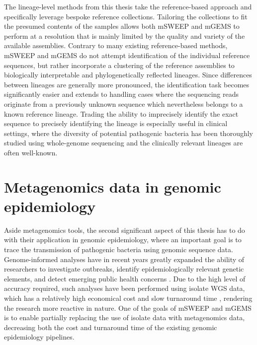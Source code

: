 \documentclass[officiallayout]{tktla}
\begin{document}
The lineage-level methods from this thesis take the reference-based
approach and specifically leverage bespoke reference
collections. Tailoring the collections to fit the presumed contents of
the samples allows both mSWEEP and mGEMS to perform at a resolution
that is mainly limited by the quality and variety of the available
assemblies. Contrary to many existing reference-based methods, mSWEEP
and mGEMS do not attempt identification of the individual reference
sequences, but rather incorporate a clustering of the reference
assemblies to biologically interpretable and phylogenetically
reflected lineages. Since differences between lineages are generally
more pronounced, the identification task becomes significantly easier
\citep{sankar2016bayesian} and extends to handling cases where the
sequencing reads originate from a previously unknown sequence which
nevertheless belongs to a known reference lineage. Trading the ability
to imprecisely identify the exact sequence to precisely identifying
the lineage is especially useful in clinical settings, where the
diversity of potential pathogenic bacteria has been thoroughly studied
using whole-genome sequencing and the clinically relevant lineages are
often well-known.
\vfill

\section{Metagenomics data in genomic epidemiology}

Aside metagenomics tools, the second significant aspect of this thesis
has to do with their application in genomic epidemiology, where an
important goal is to trace the transmission of pathogenic bacteria
using genomic sequence data. Genome-informed analyses have in recent
years greatly expanded the ability of researchers to investigate
outbreaks, identify epidemiologically relevant genetic elements, and
detect emerging public health concerns \citep{tang2017infection,
  van2019status, grad2014epidemiologic, kwong2015whole}. Due to the
high level of accuracy required, such analyses have been performed
using isolate WGS data, which has a relatively high economical cost
and slow turnaround time \citep{rossen2018practical}, rendering the
research more reactive in nature. One of the goals of mSWEEP and mGEMS
is to enable partially replacing the use of isolate data with
metagenomics data, decreasing both the cost and turnaround time of the
existing genomic epidemiology pipelines.
\end{document}
